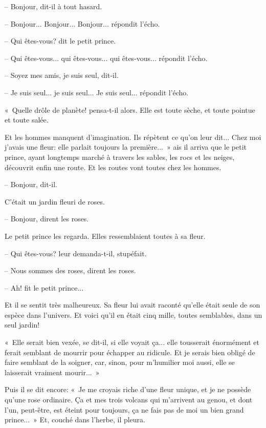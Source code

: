 \documentclass[a4paper]{report}
\begin{document}

-- Bonjour, dit-il à tout hasard.

-- Bonjour... Bonjour... Bonjour... répondit l'écho.

-- Qui êtes-vous? dit le petit prince.

-- Qui êtes-vous... qui êtes-vous... qui êtes-vous... répondit l'écho.

-- Soyez mes amis, je suis seul, dit-il.

-- Je suis seul... je suis seul... Je suis seul... répondit l'écho.

«~Quelle drôle de planète! pensa-t-il alors. Elle est toute sèche, et toute pointue et toute salée.

Et les hommes manquent d'imagination. Ils répètent ce qu'on leur dit... Chez moi j'avais une fleur: elle parlait toujours la première...~»
\parachapter{} %
ais il arriva que le petit prince, ayant longtemps marché à travers les sables, les rocs et les neiges, découvrit enfin une route. Et les routes vont toutes chez les hommes.

-- Bonjour, dit-il.

C'était un jardin fleuri de roses.

-- Bonjour, dirent les roses.

Le petit prince les regarda. Elles ressemblaient toutes à sa fleur.

-- Qui êtes-vous? leur demanda-t-il, stupéfait.

-- Nous sommes des roses, dirent les roses.

-- Ah! fit le petit prince...

Et il se sentit très malheureux. Sa fleur lui avait raconté qu'elle était seule de son espèce dans l'univers. Et voici qu'il en était cinq mille, toutes semblables, dans un seul jardin!


«~Elle serait bien vexée, se dit-il, si elle voyait ça... elle tousserait énormément et ferait semblant de mourrir pour échapper au ridicule. Et je serais bien obligé de faire semblant de la soigner, car, sinon, pour m'humilier moi aussi, elle se laisserait vraiment mourir...~»

Puis il se dit encore: «~Je me croyais riche d'une fleur unique, et je ne possède qu'une rose ordinaire. Ça et mes trois volcans qui m'arrivent au genou, et dont l'un, peut-être, est éteint pour toujours, ça ne fais pas de moi un bien grand prince...~» Et, couché dans l'herbe, il pleura. 
\end{document}

